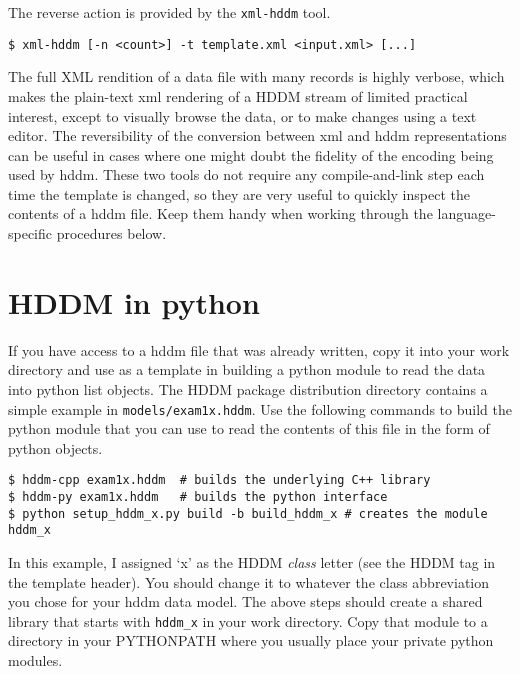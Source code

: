\documentclass{revtex4}
\begin{document}
The reverse action is provided by the \texttt{xml-{}hddm} tool.

\vspace{1cm}
\begin{minipage}{1cm}
\begin{verbatim}
$ xml-hddm [-n <count>] -t template.xml <input.xml> [...]
\end{verbatim}
\end{minipage}
\vspace{1cm}

The full XML rendition of a data file with many records is highly verbose,
which makes the plain-text xml rendering of a HDDM stream of limited practical
interest, except to visually browse the data, or to make changes using a text
editor. The reversibility of the conversion between xml and hddm representations
can be useful in cases where one might doubt the fidelity of the encoding being
used by hddm. These two tools do not require any compile-{}and-{}link step each
time the template is changed, so they are very useful to quickly inspect the
contents of a hddm file. Keep them handy when working through the
language-{}specific procedures below.

\section{HDDM in python}

If you have access to a hddm file that was already written, copy it into your
work directory and use as a template in building a python module to read the data
into python list objects. The HDDM package distribution directory contains a 
simple example in \texttt{models/exam1x.hddm}. Use the following commands to build
the python module that you can use to read the contents of this file in the
form of python objects.

\vspace{1cm}
\begin{minipage}{12cm}
\begin{verbatim}
$ hddm-cpp exam1x.hddm  # builds the underlying C++ library
$ hddm-py exam1x.hddm   # builds the python interface
$ python setup_hddm_x.py build -b build_hddm_x # creates the module hddm_x
\end{verbatim}
\end{minipage}
\vspace{1cm}

In this example, I assigned `x' as the HDDM {\em class} letter (see the HDDM tag
in the template header). You should change it to whatever the class abbreviation
you chose for your hddm data model. The above steps should create a shared library
that starts with \texttt{hddm\_x} in your work directory. Copy that module to a
directory in your PYTHONPATH where you usually place your private python modules.
\end{document}
